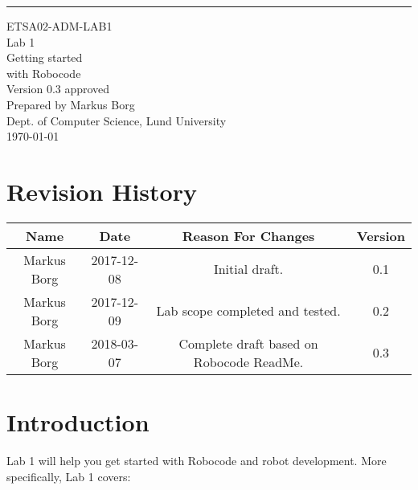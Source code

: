 \documentclass{scrreprt}
\date{}
\def\myversion{0.3 }
\begin{document}
\begin{flushright}
    \rule{16cm}{5pt}\vskip1cm
    \begin{bfseries}
    	\LARGE{ETSA02-ADM-LAB1}\\
    	\vspace{1.5cm}
        \Huge{Lab 1}\\
        \vspace{0.5cm}
        Getting started\\
        \vspace{0.5cm}
        with Robocode\\
        \vspace{1.5cm}
        \LARGE{Version \myversion approved}\\
        \vspace{1.5cm}
        Prepared by Markus Borg\\
        Dept. of Computer Science, Lund University\\
        \vspace{1.5cm}
        \today\\
    \end{bfseries}
\end{flushright}


\chapter*{Revision History}

\begin{center}
    \begin{tabular}{|c|c|c|c|}
        \hline
	    Name & Date & Reason For Changes & Version\\
        \hline
	    Markus Borg & 2017-12-08 & Initial draft. & 0.1\\
        \hline
        Markus Borg & 2017-12-09 & Lab scope completed and tested. & 0.2\\
        \hline
        Markus Borg & 2018-03-07 & Complete draft based on Robocode ReadMe. & 0.3\\
        \hline
    \end{tabular}
\end{center}

\chapter{Introduction}
Lab 1 will help you get started with Robocode and robot development. More specifically, Lab 1 covers:
\end{document}

